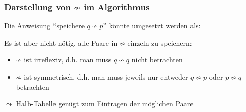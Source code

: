 \documentclass[onlymath]{beamer}
\begin{document}
\begin{frame}\frametitle{Darstellung von $\not\sim$ im Algorithmus}

Die Anweisung "`speichere $q\not\sim p$"' könnte umgesetzt werden als:\\[1ex]
\bigskip

Es ist aber nicht nötig, alle Paare in ${\not\sim}$ einzeln zu speichern:
\begin{itemize}
\item $\not\sim$ ist irreflexiv, d.h. man muss $q\not\sim q$ nicht betrachten
\item $\not\sim$ ist symmetrisch, d.h. man muss jeweils nur entweder $q\not\sim p$ oder $p\not\sim q$ betrachten\pause
\end{itemize}
$\leadsto$ Halb-Tabelle genügt zum Eintragen der möglichen Paare\medskip


\end{frame}

\newcommand{\hicell}[1]{\only<#1|handout:0>{\cellcolor{strongyellow}}}
\newcommand{\upcell}[2]{\only<#1|handout:0>{\cellcolor{strongyellow}}\only<#1->{#2}}
\newcommand{\locell}[1]{\only<#1|handout:0>{\cellcolor{darkgreen!20}}}
\end{document}
